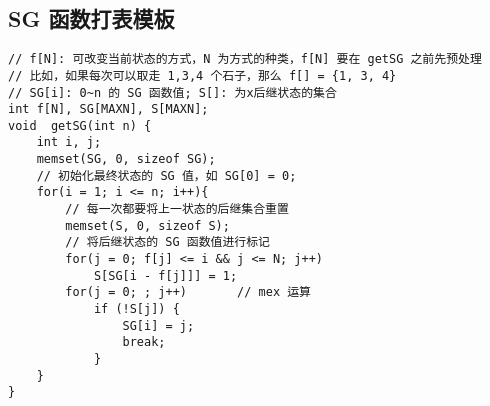 \subsection{SG 函数打表模板}
\begin{verbatim}
// f[N]: 可改变当前状态的方式，N 为方式的种类，f[N] 要在 getSG 之前先预处理
// 比如，如果每次可以取走 1,3,4 个石子，那么 f[] = {1, 3, 4}
// SG[i]: 0~n 的 SG 函数值; S[]: 为x后继状态的集合
int f[N], SG[MAXN], S[MAXN];
void  getSG(int n) {
    int i, j;
    memset(SG, 0, sizeof SG);
    // 初始化最终状态的 SG 值，如 SG[0] = 0;
    for(i = 1; i <= n; i++){
        // 每一次都要将上一状态的后继集合重置
        memset(S, 0, sizeof S);
        // 将后继状态的 SG 函数值进行标记
        for(j = 0; f[j] <= i && j <= N; j++)
            S[SG[i - f[j]]] = 1;
        for(j = 0; ; j++)       // mex 运算
            if (!S[j]) {
                SG[i] = j;
                break;
            }
    }
}
\end{verbatim}